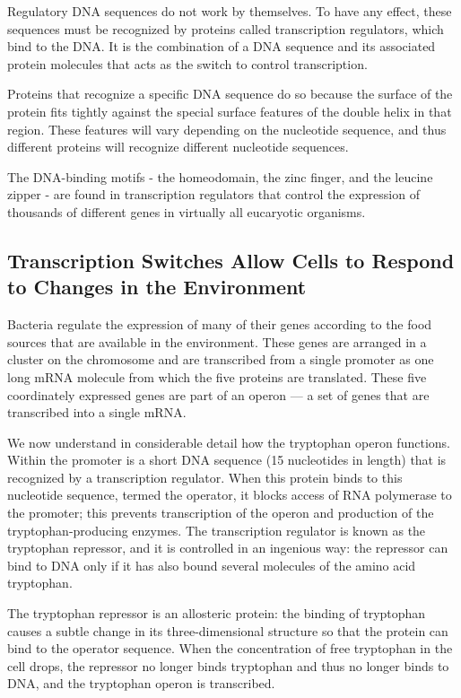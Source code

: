 Regulatory DNA sequences do not work by themselves. To have any
effect, these sequences must be recognized by proteins called transcription 
regulators, which bind to the DNA. It is the combination of a DNA
sequence and its associated protein molecules that acts as the switch
to control transcription.

Proteins that recognize a specific DNA sequence do so because the surface 
of the protein fits tightly against the special surface features of the
double helix in that region. These features will vary depending on the
nucleotide sequence, and thus different proteins will recognize different
nucleotide sequences.

The DNA-binding motifs - the homeodomain, the zinc finger, and the leucine zipper - 
are found in transcription regulators that control the expression of thousands of different
genes in virtually all eucaryotic organisms. 

\subsection{Transcription Switches Allow Cells to Respond to Changes in the Environment}

Bacteria regulate the expression of many of their genes according to the food sources
that are available in the environment. These
genes are arranged in a cluster on the chromosome and are transcribed
from a single promoter as one long mRNA molecule from which the five
proteins are translated. These five coordinately expressed genes are part of an
operon — a set of genes that are transcribed into a single mRNA.

We now understand in considerable detail how the tryptophan operon
functions. Within the promoter is a short DNA sequence (15 nucleotides
in length) that is recognized by a transcription regulator. When this protein 
binds to this nucleotide sequence, termed the operator, it blocks
access of RNA polymerase to the promoter; this prevents transcription
of the operon and production of the tryptophan-producing enzymes. The
transcription regulator is known as the tryptophan repressor, and it is controlled 
in an ingenious way: the repressor can bind to DNA only if it has
also bound several molecules of the amino acid tryptophan.

The tryptophan repressor is an allosteric protein: the
binding of tryptophan causes a subtle change in its three-dimensional
structure so that the protein can bind to the operator sequence. When
the concentration of free tryptophan in the cell drops, the repressor no
longer binds tryptophan and thus no longer binds to DNA, and the tryptophan 
operon is transcribed.

